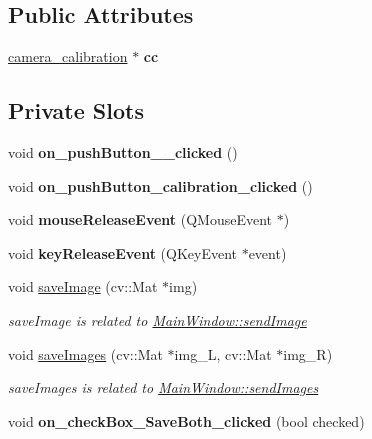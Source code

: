 \subsection*{Public Attributes}
\begin{DoxyCompactItemize}
\item 
\hypertarget{classcalibration_form_afe63228c0cb2ad7c6bade4f38528dc33}{}\hyperlink{classcamera__calibration}{camera\+\_\+calibration} $\ast$ {\bfseries cc}\label{classcalibration_form_afe63228c0cb2ad7c6bade4f38528dc33}

\end{DoxyCompactItemize}
\subsection*{Private Slots}
\begin{DoxyCompactItemize}
\item 
\hypertarget{classcalibration_form_a41bb50ba937dcc523fdef9c5a178728a}{}void {\bfseries on\+\_\+push\+Button\+\_\+\_\+clicked} ()\label{classcalibration_form_a41bb50ba937dcc523fdef9c5a178728a}

\item 
\hypertarget{classcalibration_form_a16256ba3d98cc18d56f25be0391a371e}{}void {\bfseries on\+\_\+push\+Button\+\_\+calibration\+\_\+clicked} ()\label{classcalibration_form_a16256ba3d98cc18d56f25be0391a371e}

\item 
\hypertarget{classcalibration_form_aac07475302f18cd24400dbd6039296ff}{}void {\bfseries mouse\+Release\+Event} (Q\+Mouse\+Event $\ast$)\label{classcalibration_form_aac07475302f18cd24400dbd6039296ff}

\item 
\hypertarget{classcalibration_form_aa86ed00af593676a7c0f172967e330aa}{}void {\bfseries key\+Release\+Event} (Q\+Key\+Event $\ast$event)\label{classcalibration_form_aa86ed00af593676a7c0f172967e330aa}

\item 
void \hyperlink{classcalibration_form_a9682501d6acfcbbcfc52eaac626a2c10}{save\+Image} (cv\+::\+Mat $\ast$img)
\begin{DoxyCompactList}\small\item\em save\+Image is related to \hyperlink{}{Main\+Window\+::send\+Image}\end{DoxyCompactList}\item 
void \hyperlink{classcalibration_form_af82645151b4b3c682996b25ba498581b}{save\+Images} (cv\+::\+Mat $\ast$img\+\_\+\+L, cv\+::\+Mat $\ast$img\+\_\+\+R)
\begin{DoxyCompactList}\small\item\em save\+Images is related to \hyperlink{}{Main\+Window\+::send\+Images}\end{DoxyCompactList}\item 
\hypertarget{classcalibration_form_a46bd3268aef5d6d736732546f22f0ea4}{}void {\bfseries on\+\_\+check\+Box\+\_\+\+Save\+Both\+\_\+clicked} (bool checked)\label{classcalibration_form_a46bd3268aef5d6d736732546f22f0ea4}


\end{DoxyCompactItemize}
